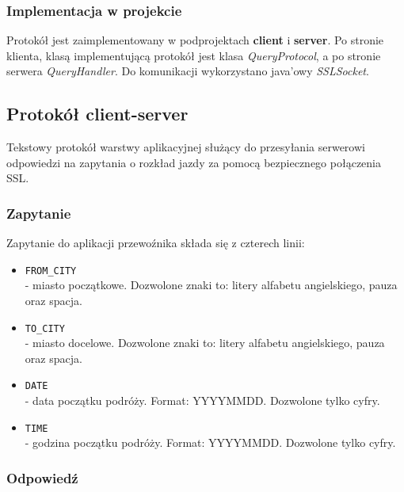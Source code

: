 \documentclass[pdftex,13pt,a4paper]{article}
\begin{document}
\subsubsection{Implementacja w projekcie}
Protokół jest zaimplementowany w podprojektach \textbf{client} i \textbf{server}. Po stronie klienta, klasą implementującą protokół jest klasa \textit{QueryProtocol}, a po stronie serwera \textit{QueryHandler}. Do komunikacji wykorzystano java'owy \textit{SSLSocket}.



\subsection{Protokół client-server}

Tekstowy protokół warstwy aplikacyjnej służący do przesyłania serwerowi odpowiedzi na zapytania o rozkład jazdy za pomocą bezpiecznego połączenia SSL.

\subsubsection{Zapytanie}
Zapytanie do aplikacji przewoźnika składa się z czterech linii:

\begin{itemize}

\item \texttt{FROM\_CITY}\\
- miasto początkowe. Dozwolone znaki to: litery alfabetu angielskiego, pauza oraz spacja.

\item \texttt{TO\_CITY}\\
- miasto docelowe. Dozwolone znaki to: litery alfabetu angielskiego, pauza oraz spacja.

\item \texttt{DATE}\\
- data początku podróży. Format: YYYYMMDD. Dozwolone tylko cyfry.

\item \texttt{TIME}\\
- godzina początku podróży. Format: YYYYMMDD. Dozwolone tylko cyfry.

\end{itemize}

\subsubsection{Odpowiedź}
\end{document}
